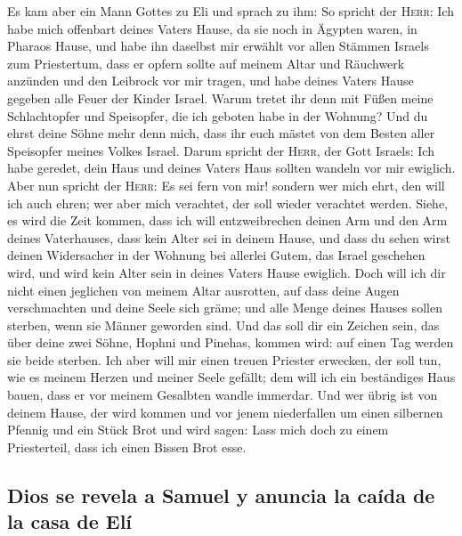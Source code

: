  Es kam aber ein Mann Gottes zu Eli und sprach zu ihm: So
spricht der \textsc{Herr}: Ich habe mich offenbart deines Vaters Hause,
da sie noch in Ägypten waren, in Pharaos Hause,  und habe
ihn daselbst mir erwählt vor allen Stämmen Israels zum Priestertum, dass
er opfern sollte auf meinem Altar und Räuchwerk anzünden und den
Leibrock vor mir tragen, und habe deines Vaters Hause gegeben alle Feuer
der Kinder Israel.  Warum tretet ihr denn mit Füßen meine
Schlachtopfer und Speisopfer, die ich geboten habe in der Wohnung? Und
du ehrst deine Söhne mehr denn mich, dass ihr euch mästet von dem Besten
aller Speisopfer meines Volkes Israel.  Darum spricht der
\textsc{Herr}, der Gott Israels: Ich habe geredet, dein Haus und deines
Vaters Haus sollten wandeln vor mir ewiglich. Aber nun spricht der
\textsc{Herr}: Es sei fern von mir! sondern wer mich ehrt, den will ich
auch ehren; wer aber mich verachtet, der soll wieder verachtet werden.
 Siehe, es wird die Zeit kommen, dass ich will
entzweibrechen deinen Arm und den Arm deines Vaterhauses, dass kein
Alter sei in deinem Hause,  und dass du sehen wirst
deinen Widersacher in der Wohnung bei allerlei Gutem, das Israel
geschehen wird, und wird kein Alter sein in deines Vaters Hause
ewiglich.  Doch will ich dir nicht einen jeglichen von
meinem Altar ausrotten, auf dass deine Augen verschmachten und deine
Seele sich gräme; und alle Menge deines Hauses sollen sterben, wenn sie
Männer geworden sind.  Und das soll dir ein Zeichen sein,
das über deine zwei Söhne, Hophni und Pinehas, kommen wird: auf einen
Tag werden sie beide sterben.  Ich aber will mir einen
treuen Priester erwecken, der soll tun, wie es meinem Herzen und meiner
Seele gefällt; dem will ich ein beständiges Haus bauen, dass er vor
meinem Gesalbten wandle immerdar.  Und wer übrig ist von
deinem Hause, der wird kommen und vor jenem niederfallen um einen
silbernen Pfennig und ein Stück Brot und wird sagen: Lass mich doch zu
einem Priesterteil, dass ich einen Bissen Brot esse.

\hypertarget{dios-se-revela-a-samuel-y-anuncia-la-cauxedda-de-la-casa-de-eluxed}{%
\subsection{Dios se revela a Samuel y anuncia la caída de la casa de
Elí}\label{dios-se-revela-a-samuel-y-anuncia-la-cauxedda-de-la-casa-de-eluxed}}

